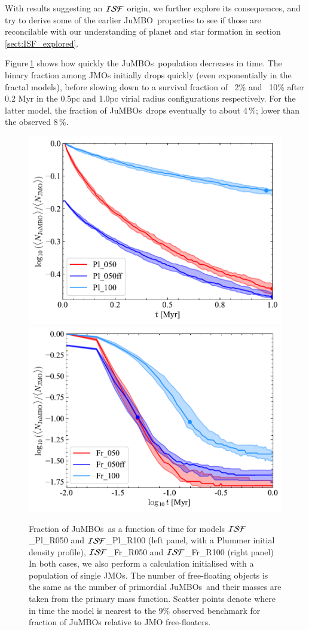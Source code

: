 \documentclass[submission,phys]{lib/SciPost}
\newcommand{\jumbo}{\mbox{JuMBO}}
\newcommand{\jumbos}{\mbox{JuMBOs}}
\begin{document}
With results suggesting an ${\cal ISF}$ origin, we further
explore its consequences, and try to derive some of the earlier
\jumbo\, properties to see if those are reconcilable with our
understanding of planet and star formation in
section\,\ref{sect:ISF_explored}.

Figure\,\ref{Fig:Fjumbo_vs_time_model_ISF_Fr} shows how quickly the
\jumbos\, population decreases in time. The binary
fraction among JMOs initially drops quickly (even
exponentially in the fractal models), before slowing down to a survival 
fraction of ~2\% and ~10\% after 0.2 Myr in the 0.5pc and 1.0pc virial 
radius configurations respectively. For the latter model, the fraction of 
\jumbos\, drops eventually to about 4\,\%; lower than the observed 8\,\%.

\begin{figure}
    \centering
    \includegraphics[width=0.49\columnwidth]{figures/Plummer_General_fJuMBO_evol.pdf}
    \includegraphics[width=0.49\columnwidth]{figures/Fractal_General_fJuMBO_evol.pdf}
    \caption{Fraction of \jumbos\ as a function of time for models
      ${\cal ISF}$\_Pl\_R050 and ${\cal ISF}$\_Pl\_R100 (left panel,
      with a Plummer initial density profile), ${\cal ISF}$\_Fr\_R050
      and ${\cal ISF}$\_Fr\_R100 (right panel) In both cases, we also perform a calculation initialised with a
      population of single JMOs. The number of free-floating 
      objects is the same as the number of primordial
      \jumbos\, and their masses are taken from the primary mass
      function. Scatter points denote where in time the model is nearest to the $9\%$ observed benchmark for fraction of JuMBOs relative to JMO free-floaters.
}
        \label{Fig:Fjumbo_vs_time_model_ISF_Pl}
        \label{Fig:Fjumbo_vs_time_model_ISF_Fr}
\end{figure}
\end{document}
